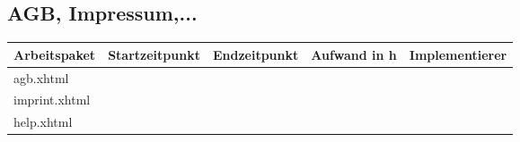 \begin{landscape}
	\subsection{AGB, Impressum,...}
	\begin{tabular}{|p{10cm}|p{4cm}|p{3cm}|p{3cm}|p{3cm}|}
		\hline  \textbf{Arbeitspaket} & \textbf{Startzeitpunkt} & \textbf{Endzeitpunkt} & \textbf{Aufwand in h} & \textbf{Implementierer} \\ 
		\hline   agb.xhtml                                 &                            &                             &                     &\\
		\hline   imprint.xhtml                              &                            &                             &                     &\\
		\hline   help.xhtml        &                            &                             &                     &\\
		\hline 
	\end{tabular} \ \\
	\ \\			
\end{landscape}